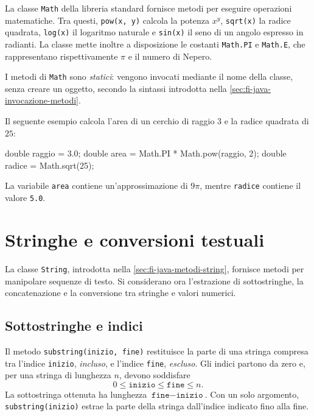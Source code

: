 La classe \texttt{Math} della libreria standard fornisce metodi
per eseguire operazioni matematiche. Tra questi,
\texttt{pow(x, y)} calcola la potenza \(x^y\),
\texttt{sqrt(x)} la radice quadrata, \texttt{log(x)}
il logaritmo naturale e \texttt{sin(x)} il seno di un
angolo espresso in radianti. La classe mette inoltre
a disposizione le costanti \texttt{Math.PI} e
\texttt{Math.E}, che rappresentano rispettivamente
\(\pi\) e il numero di Nepero.

I metodi di \texttt{Math} sono \emph{statici}: vengono
invocati mediante il nome della classe, senza creare
un oggetto, secondo la sintassi introdotta nella
\cref{sec:fi-java-invocazione-metodi}.

\begin{example}
Il seguente esempio calcola l'area di un cerchio
di raggio \(3\) e la radice quadrata di \(25\):

\begin{unipdcode}[language=Java]
double raggio = 3.0;
double area = Math.PI * Math.pow(raggio, 2);
double radice = Math.sqrt(25);
\end{unipdcode}

La variabile \texttt{area} contiene un'approssimazione
di \(9\pi\), mentre \texttt{radice} contiene
il valore \texttt{5.0}.
\end{example}

\section{Stringhe e conversioni testuali}
\label{sec:fi-java-stringhe-operazioni}

La classe \texttt{String}, introdotta nella
\cref{sec:fi-java-metodi-string}, fornisce metodi per
manipolare sequenze di testo. Si considerano ora
l'estrazione di sottostringhe, la concatenazione e
la conversione tra stringhe e valori numerici.

\subsection{Sottostringhe e indici}
\label{sec:fi-java-substring}

Il metodo \texttt{substring(inizio, fine)} restituisce
la parte di una stringa compresa tra l'indice
\texttt{inizio}, \emph{incluso}, e l'indice
\texttt{fine}, \emph{escluso}. Gli indici partono
da zero e, per una stringa di lunghezza \(n\),
devono soddisfare
\[
  0 \leq \texttt{inizio} \leq \texttt{fine} \leq n.
\]
La sottostringa ottenuta ha lunghezza
\(\texttt{fine}-\texttt{inizio}\).
Con un solo argomento, \texttt{substring(inizio)}
estrae la parte della stringa dall'indice indicato
fino alla fine.

